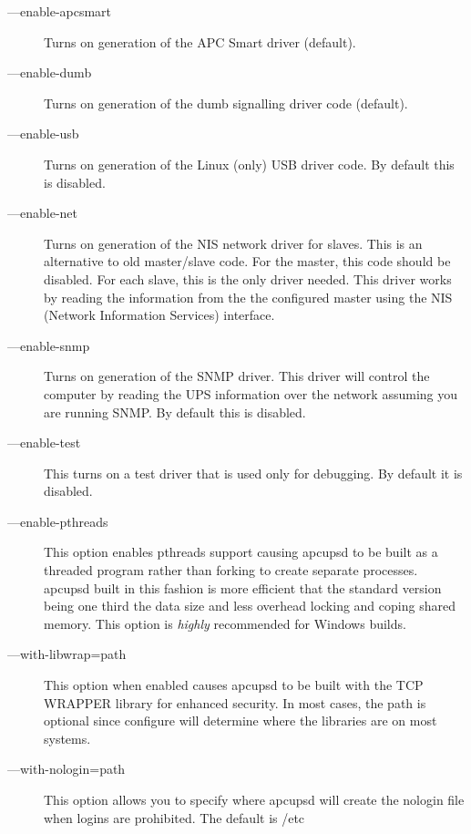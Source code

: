 \begin{description}
\item [{---}enable-apcsmart]
   Turns on generation of the APC Smart driver (default).  

\item [{---}enable-dumb]
   Turns on generation of the dumb signalling driver code (default).  

\item [{---}enable-usb]
   Turns on generation of the Linux (only) USB driver code. By default this is
disabled.  

\item [{---}enable-net]
   Turns on generation of the NIS network driver for slaves. This is an
alternative to old master/slave code. For the master, this code should be
disabled. For each slave, this is the only driver needed. This driver works by
reading the information from the the configured master using the NIS (Network
Information Services) interface.  

\item [{---}enable-snmp]
   Turns on generation of the SNMP driver. This driver will control the computer
by reading the UPS information over the network assuming you are running SNMP.
By default this is disabled.  

\item [{---}enable-test]
   This turns on a test driver that is used only for debugging. By default it is
disabled.  

\item [{---}enable-pthreads]
   This option enables pthreads support causing apcupsd to be built as a threaded
program rather than forking to create separate processes. apcupsd built in
this fashion is more efficient that the standard version being one third the
data size and less overhead locking and coping shared memory. This option is
{\it highly} recommended for Windows builds.  

\item [{---}with-libwrap=\lt{}path\gt{}]
   This option when enabled causes apcupsd to be built with the TCP WRAPPER
library for enhanced security. In most cases, the \lt{}path\gt{} is optional
since configure will determine where the libraries are on most systems.  

\item [{---}with-nologin=\lt{}path\gt{}]
   This option allows you to specify where apcupsd will create the nologin file
when logins are prohibited. The default is /etc  


\end{description}
